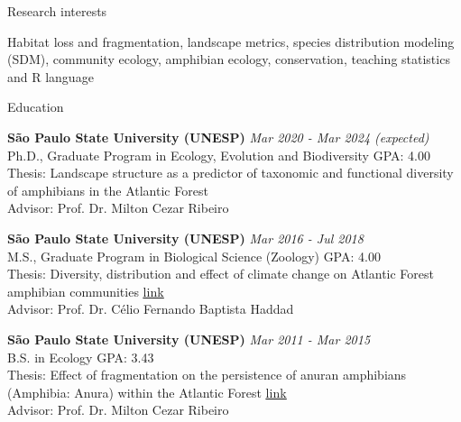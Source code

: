 \documentclass{resume}
\begin{document}
\begin{rSection}{Research interests}

Habitat loss and fragmentation, landscape metrics, species distribution modeling (SDM), community ecology, amphibian ecology, conservation, teaching statistics and R language

\end{rSection}


\begin{rSection}{Education}

{\bf São Paulo State University (UNESP)} \hfill {\em Mar 2020 - Mar 2024 (expected)} 
\\ Ph.D., Graduate Program in Ecology, Evolution and Biodiversity \hfill { GPA: 4.00 } 
\\ Thesis: Landscape structure as a predictor of taxonomic and functional diversity of amphibians in the Atlantic Forest \\ Advisor: Prof. Dr. Milton Cezar Ribeiro

{\bf São Paulo State University (UNESP)} \hfill {\em Mar 2016 - Jul 2018} 
\\ M.S., Graduate Program in Biological Science (Zoology)\hfill { GPA: 4.00 } 
\\ Thesis: Diversity, distribution and effect of climate change on Atlantic Forest amphibian communities \href{https://repositorio.unesp.br/handle/11449/154993}{\underline{link}} 
\\ Advisor: Prof. Dr. Célio Fernando Baptista Haddad

{\bf São Paulo State University (UNESP)} \hfill {\em Mar 2011 - Mar 2015} 
\\ B.S. in Ecology\hfill { GPA: 3.43 } 
\\ Thesis: Effect of fragmentation on the persistence of anuran amphibians (Amphibia: Anura) within the Atlantic Forest \href{https://repositorio.unesp.br/handle/11449/138991}{\underline{link}} 
\\ Advisor: Prof. Dr. Milton Cezar Ribeiro

\end{rSection}

\end{document}
